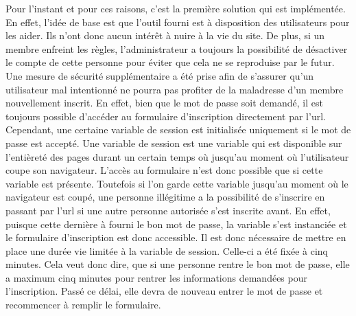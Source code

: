 \documentclass[12pt, a4paper, oneside]{article}
\begin{document}
    \indent Pour l'instant et pour ces raisons, c'est la première solution qui est implémentée. En effet, l'idée de base est que l'outil fourni est à disposition des utilisateurs pour les aider. Ils n'ont donc aucun intérêt à nuire à la vie du site. De plus, si un membre enfreint les règles, l'administrateur a toujours la possibilité de désactiver le compte de cette personne pour éviter que cela ne se reproduise par le futur. Une mesure de sécurité supplémentaire a été prise afin de s'assurer qu'un utilisateur mal intentionné ne pourra pas profiter de la maladresse d'un membre nouvellement inscrit. En effet, bien que le mot de passe soit demandé, il est toujours possible d'accéder au formulaire d'inscription directement par l'url. Cependant, une certaine variable de session est initialisée uniquement si le mot de passe est accepté. Une variable de session est une variable qui est disponible sur l'entièreté des pages durant un certain temps où jusqu'au moment où l'utilisateur coupe son navigateur. L'accès au formulaire n'est donc possible que si cette variable est présente. Toutefois si l'on garde cette variable jusqu'au moment où le navigateur est coupé, une personne illégitime a la possibilité de s'inscrire en passant par l'url si une autre personne autorisée s'est inscrite avant. En effet, puisque cette dernière à fourni le bon mot de passe, la variable s'est instanciée et le formulaire d'inscription est donc accessible. Il est donc nécessaire de mettre en place une durée vie limitée à la variable de session. Celle-ci a été fixée à cinq minutes. Cela veut donc dire, que si une personne rentre le bon mot de passe, elle a maximum cinq minutes pour rentrer les informations demandées pour l'inscription. Passé ce délai, elle devra de nouveau entrer le mot de passe et recommencer à remplir le formulaire.

\end{document}
